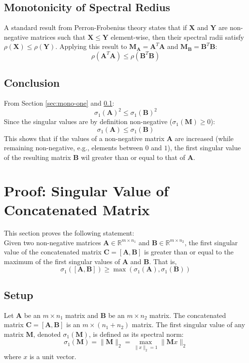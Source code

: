 \subsection{Monotonicity of Spectral Redius}
\label{sec:mono-three}
A standard result from Perron-Frobenius theory states that if $\mathbf{X}$ and
$\mathbf{Y}$ are non-negative matrices such that $\mathbf{X} \leq \mathbf{Y}$
element-wise, then their spectral radii satisfy $\rho(\mathbf{X}) \leq
\rho(\mathbf{Y})$. Applying this result to $\mathbf{M}_{\mathbf{A}} =
\mathbf{A}^T\mathbf{A}$ and $\mathbf{M}_{\mathbf{B}} =
\mathbf{B}^T\mathbf{B}$:
\[ \rho(\mathbf{A}^T\mathbf{A}) \leq \rho(\mathbf{B}^T\mathbf{B}) \]

\subsection{Conclusion}
From Section \ref{sec:mono-one} and \ref{sec:mono-three}:
\[ \sigma_1(\mathbf{A})^2 \leq \sigma_1(\mathbf{B})^2 \]
Since the singular values are by definition non-negative ($\sigma_1(\mathbf{M})
\geq 0$):
\[ \sigma_1(\mathbf{A}) \leq \sigma_1(\mathbf{B}) \]
This shows that if the values of a non-negative matrix $\mathbf{A}$ are
increased (while remaining non-negative, e.g., elements between $0$ and $1$),
the first singular value of the resulting matrix $\mathbf{B}$ wil greater than
or equal to that of $\mathbf{A}$.

\section{Proof: Singular Value of Concatenated Matrix}
This section proves the following statement:\\
Given two non-negative matrices $\mathbf{A} \in \mathbb{R}^{m \times n_1}$ and
$\mathbf{B} \in \mathbb{R}^{m \times n_2}$, the first singular value of the
concatenated matrix $\mathbf{C} = [\mathbf{A}, \mathbf{B}]$ is greater than or
equal to the maximum of the first singular values of $\mathbf{A}$ and
$\mathbf{B}$. That is,
\[ \sigma_1([\mathbf{A}, \mathbf{B}]) \geq \max(\sigma_1(\mathbf{A}),
\sigma_1(\mathbf{B})) \]

\subsection{Setup}
Let $\mathbf{A}$ be an $m \times n_1$ matrix and $\mathbf{B}$ be an $m \times
n_2$ matrix. The concatenated matrix $\mathbf{C} = [\mathbf{A}, \mathbf{B}]$ is
an $m \times (n_1 + n_2)$ matrix. The first singular value of any matrix
$\mathbf{M}$, denoted $\sigma_1(\mathbf{M})$, is defined as its spectral norm:
\[ \sigma_1(\mathbf{M}) = \parallel \mathbf{M} \parallel_2 = \max_{\parallel x
\parallel_2 = 1} \parallel \mathbf{M}x \parallel_2 \]
where $x$ is a unit vector.

